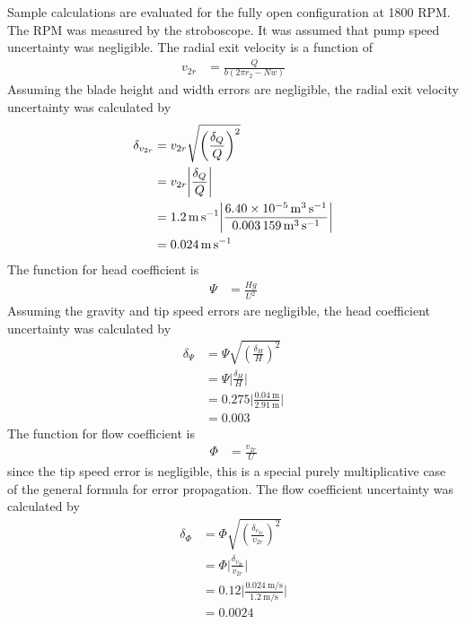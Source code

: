 \FloatBarrier
Sample calculations are evaluated for the fully open configuration at 1800 RPM. The RPM was measured by the stroboscope. It was assumed that pump speed uncertainty was negligible. The radial exit velocity is a function of 
\begin{align*}
    v_{2r} &= \frac{Q}{b(2\pi r_2 - Nw)} 
\end{align*}
Assuming the blade height and width errors are negligible, the radial exit velocity uncertainty was calculated by
\begin{align*}
    \delta_{v_{2r}} &= v_{2r} \sqrt{\left(\frac{\delta_Q}{Q}\right)^2} \\
    &= v_{2r} \bigg|\frac{\delta_Q}{Q}\bigg| \\
    &= \qty{1.2}{\meter\per\second} \bigg|\frac{\qty{6.40E-05}{\meter\cubed\per\second}}{\qty{0.003159}{\meter\cubed\per\second}}\bigg| \\
    &= \qty{0.024}{\meter\per\second}
\end{align*}
The function for head coefficient is
\begin{align*}
    \Psi &= \frac{Hg}{U^2}
\end{align*}
Assuming the gravity and tip speed errors are negligible, the head coefficient uncertainty was calculated by
\begin{align*}
    \delta_{\Psi} &= \Psi \sqrt{\left(\frac{\delta_H}{H}\right)^2} \\
    &= \Psi \bigg|\frac{\delta_H}{H}\bigg| \\
    &= 0.275 \bigg|\frac{\qty{0.04}{\meter}}{\qty{2.91}{\meter}}\bigg| \\
    &= 0.003
\end{align*}
The function for flow coefficient is
\begin{align*}
    \Phi &= \frac{v_{2r}}{U}
\end{align*}
since the tip speed error is negligible, this is a special purely multiplicative case of the general formula for error propagation. The flow coefficient uncertainty was calculated by
\begin{align*}
    \delta_{\Phi} &= \Phi \sqrt{\left(\frac{\delta_{v_{2r}}}{v_{2r}}\right)^2} \\
    &= \Phi \bigg|\frac{\delta_{v_{2r}}}{v_{2r}}\bigg| \\
    &= 0.12 \bigg|\frac{\qty{0.024}{\meter\per\second}}{\qty{1.2}{\meter\per\second}}\bigg| \\
    &= 0.0024
\end{align*}

